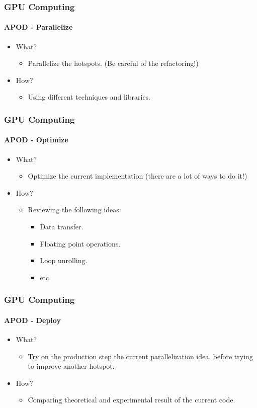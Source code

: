 \begin{frame}
    \frametitle{GPU Computing}
    \framesubtitle{APOD - Parallelize}
    \begin{itemize}
        \item What?
        \begin{itemize}
            \item Parallelize the hotspots.
                (Be careful of the refactoring!)
        \end{itemize}
        \item How?
        \begin{itemize}
            \item Using different techniques and libraries.
        \end{itemize}
    \end{itemize}
\end{frame}

\begin{frame}
    \frametitle{GPU Computing}
    \framesubtitle{APOD - Optimize}
    \begin{itemize}
        \item What?
        \begin{itemize}
            \item Optimize the current implementation (there are a lot of ways to do it!)
        \end{itemize}
        \item How?
        \begin{itemize}
            \item Reviewing the following ideas:
            \begin{itemize}
                \item Data transfer.
                \item Floating point operations.
                \item Loop unrolling.
                \item etc.
            \end{itemize}
        \end{itemize}
    \end{itemize}
\end{frame}

\begin{frame}
    \frametitle{GPU Computing}
    \framesubtitle{APOD - Deploy}
    \begin{itemize}
        \item What?
        \begin{itemize}
            \item Try on the production step the current parallelization idea,
              before trying to improve another hotspot.
        \end{itemize}
        \item How?
        \begin{itemize}
            \item Comparing theoretical and experimental result of the current code.
        \end{itemize}
    \end{itemize}
\end{frame}
